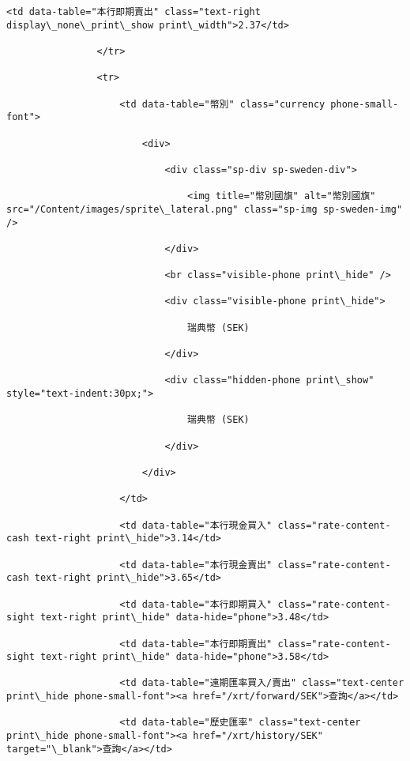 \documentclass[11pt]{article}
\begin{document}
\begin{Verbatim}[commandchars=\\\{\}]
                    <td data-table="本行即期賣出" class="text-right display\_none\_print\_show print\_width">2.37</td>

                </tr>

                <tr>

                    <td data-table="幣別" class="currency phone-small-font">

                        <div>

                            <div class="sp-div sp-sweden-div">

                                <img title="幣別國旗" alt="幣別國旗" src="/Content/images/sprite\_lateral.png" class="sp-img sp-sweden-img" />

                            </div>

                            <br class="visible-phone print\_hide" />

                            <div class="visible-phone print\_hide">

                                瑞典幣 (SEK)

                            </div>

                            <div class="hidden-phone print\_show" style="text-indent:30px;">

                                瑞典幣 (SEK)

                            </div>

                        </div>

                    </td>

                    <td data-table="本行現金買入" class="rate-content-cash text-right print\_hide">3.14</td>

                    <td data-table="本行現金賣出" class="rate-content-cash text-right print\_hide">3.65</td>

                    <td data-table="本行即期買入" class="rate-content-sight text-right print\_hide" data-hide="phone">3.48</td>

                    <td data-table="本行即期賣出" class="rate-content-sight text-right print\_hide" data-hide="phone">3.58</td>

                    <td data-table="遠期匯率買入/賣出" class="text-center print\_hide phone-small-font"><a href="/xrt/forward/SEK">查詢</a></td>

                    <td data-table="歷史匯率" class="text-center print\_hide phone-small-font"><a href="/xrt/history/SEK" target="\_blank">查詢</a></td>


\end{Verbatim}
\end{document}
